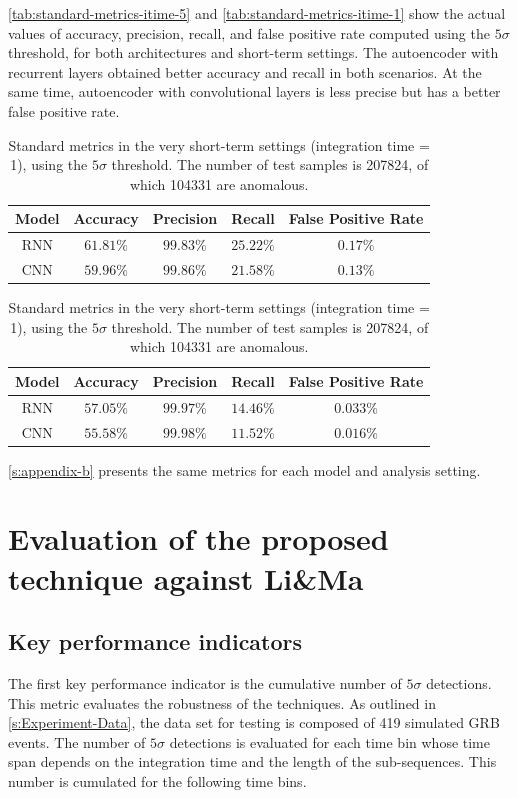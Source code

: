 \autoref{tab:standard-metrics-itime-5} and \autoref{tab:standard-metrics-itime-1} show the actual values of accuracy, precision, recall, and false positive rate computed using the $5\sigma$ threshold, for both architectures and short-term settings. The autoencoder with recurrent layers obtained better accuracy and recall in both scenarios. At the same time, autoencoder with convolutional layers is less precise but has a better false positive rate. 
\begin{table}[!htb]
\centering
\begin{tabular}{|c|c|c|c|c|}
    \hline
    Model & Accuracy & Precision & Recall & False Positive Rate \\ 
    \hline
    RNN & $61.81\%$ & $99.83\%$ & $25.22\%$ & $0.17\%$ \\
    CNN & $59.96\%$ & $99.86\%$ & $21.58\%$ & $0.13\%$ \\
    \hline
    \end{tabular}
\caption{Standard metrics in the short-term settings (integration time = 5), using the $5\sigma$ threshold. The number of test samples is 40224, of which 20531 are anomalous.}
\label{tab:standard-metrics-itime-5}
\vspace{1cm}
\centering
\begin{tabular}{|c|c|c|c|c|}
    \hline
    Model & Accuracy & Precision & Recall & False Positive Rate \\ 
    \hline
    RNN & $57.05\%$ & $99.97\%$ & $14.46\%$ & $0.033\%$ \\
    CNN & $55.58\%$ & $99.98\%$ & $11.52\%$ & $0.016\%$ \\
    \hline
\end{tabular}
\caption{Standard metrics in the very short-term settings (integration time = 1), using the $5\sigma$ threshold. The number of test samples is 207824, of which 104331 are anomalous.}
\label{tab:standard-metrics-itime-1}
\end{table}
\autoref{s:appendix-b} presents the same metrics for each model and analysis setting. 


\FloatBarrier
\section{Evaluation of the proposed technique against Li\&Ma}

\FloatBarrier
\subsection{Key performance indicators}
The first key performance indicator is the cumulative number of $5\sigma$ detections. This metric evaluates the robustness of the techniques. As outlined in \autoref{s:Experiment-Data}, the data set for testing is composed of 419 simulated GRB events. The number of $5\sigma$ detections is evaluated for each time bin whose time span depends on the integration time and the length of the sub-sequences. This number is cumulated for the following time bins. 

